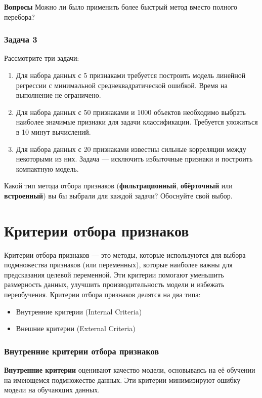 \textbf{Вопросы}
Можно ли было применить более быстрый метод вместо полного перебора?

\subsection*{Задача 3}

Рассмотрите три задачи:
\begin{enumerate}
    \item Для набора данных с 5 признаками требуется построить модель линейной регрессии с минимальной среднеквадратической ошибкой. Время на выполнение не ограничено.
    \item Для набора данных с 50 признаками и 1000 объектов необходимо выбрать наиболее значимые признаки для задачи классификации. Требуется уложиться в 10 минут вычислений.
    \item Для набора данных с 20 признаками известны сильные корреляции между некоторыми из них. Задача — исключить избыточные признаки и построить компактную модель.
\end{enumerate}

Какой тип метода отбора признаков (\textbf{фильтрационный}, \textbf{обёрточный} или \textbf{встроенный}) вы бы выбрали для каждой задачи? Обоснуйте свой выбор.

\chapter{Критерии отбора признаков}

Критерии отбора признаков — это методы, которые используются для выбора подмножества признаков (или переменных), которые наиболее важны для предсказания целевой переменной. Эти критерии помогают уменьшить размерность данных, улучшить производительность модели и избежать переобучения. Критерии отбора признаков делятся на два типа:

\begin{itemize}
    \item Внутренние критерии (Internal Criteria)
    \item Внешние критерии (External Criteria)
\end{itemize}

\subsection{Внутренние критерии отбора признаков}

\textbf{Внутренние критерии} оценивают качество модели, основываясь на её обучении на имеющемся подмножестве данных. Эти критерии минимизируют ошибку модели на обучающих данных.

